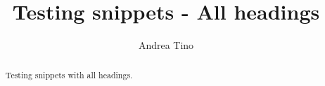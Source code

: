 \documentclass{article}
\begin{document}
\title{Testing snippets - All headings}
\author{Andrea Tino}

\maketitle

\begin{abstract}
Testing snippets with all headings.
\end{abstract}


\end{document}
